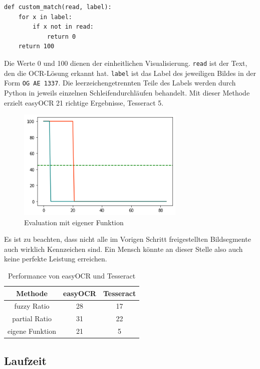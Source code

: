 \begin{lstlisting} 
def custom_match(read, label):	
	for x in label:
		if x not in read:
			return 0
	return 100
\end{lstlisting}     
Die Werte 0 und 100 dienen der einheitlichen Visualisierung. \lstinline{read} ist der Text, den die OCR-Lösung erkannt hat. \lstinline{label} ist das Label des jeweiligen Bildes in der Form \lstinline{OG AE 1337}. Die leerzeichengetrennten Teile des Labels werden durch Python in jeweils einzelnen Schleifendurchläufen behandelt.
Mit dieser Methode erzielt easyOCR 21 richtige Ergebnisse, Tesseract 5.
\begin{figure}[H]
		\centering
	\includegraphics[width=8cm]{./img/evaluation_custom_matcher.png}
	\caption{Evaluation mit eigener Funktion}
\end{figure}


Es ist zu beachten, dass nicht alle im Vorigen Schritt freigestellten Bildsegmente auch wirklich Kennzeichen sind. Ein Mensch könnte an dieser Stelle also auch keine perfekte Leistung erreichen. 

\begin{table}[h]
\begin{center}
\begin{tabular}{ c | c | c }

Methode & easyOCR & Tesseract \\
\hline
fuzzy Ratio & 28 & 17 \\
partial Ratio & 31 & 22 \\
eigene Funktion & 21 & 5 \\

\end{tabular}
\caption{Performance von easyOCR und Tesseract}
\label{Tabelle:1}
\end{center}
\end{table}



\subsection{Laufzeit}

